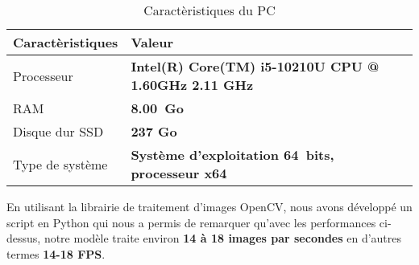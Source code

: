     \begin{table}[H]
        \centering
        \begin{tabular}{|l|l|}
            \hline
            \rowcolor{Gray}
            \textbf{Caractèristiques} & \textbf{Valeur} \\ \hline
            Processeur & \textbf{Intel(R) Core(TM) i5-10210U CPU @ 1.60GHz   2.11 GHz} \\ \hline
            RAM & \textbf{8.00 Go} \\ \hline
            Disque dur SSD & \textbf{237 Go} \\ \hline
            Type de système & \textbf{Système d’exploitation 64 bits, processeur x64} \\ \hline
        \end{tabular}
        \caption{Caractèristiques du PC}
    \end{table}
    En utilisant la librairie de traitement d’images OpenCV, nous avons développé un script en Python qui nous a permis de remarquer qu’avec les performances ci-dessus, notre modèle traite environ \textbf{14 à 18 images par secondes} en d’autres termes \textbf{14-18 FPS}.
    